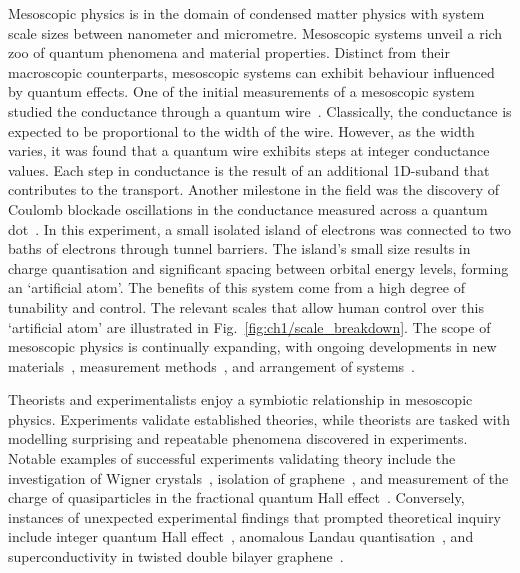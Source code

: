 \noindent Mesoscopic physics is in the domain of condensed matter physics with system scale sizes between nanometer and micrometre. Mesoscopic systems unveil a rich zoo of quantum phenomena and material properties. 
Distinct from their macroscopic counterparts, mesoscopic systems can exhibit behaviour influenced by quantum effects. One of the initial measurements of a mesoscopic system studied the conductance through a quantum wire~\cite{qpc_first_measurement, qpc_second_measurement}. 
Classically, the conductance is expected to be proportional to the width of the wire. 
However, as the width varies, it was found that a quantum wire exhibits steps at integer conductance values. Each step in conductance 
is the result of an additional 1D-suband that contributes to the transport. Another milestone in the field was the discovery of Coulomb blockade oscillations in the conductance measured across a quantum dot~\cite{first_charging_of_qd}. 
In this experiment, a small isolated island of electrons was connected to two baths of electrons through tunnel barriers. 
The island's small size results in charge quantisation and significant spacing between orbital energy levels, forming an `artificial atom'. 
The benefits of this system come from a high degree of tunability and control. The relevant scales that allow human control over this `artificial atom' are illustrated in Fig.~\ref{fig:ch1/scale_breakdown}.
The scope of mesoscopic physics is continually expanding, with ongoing developments in new materials~\cite{manfra_inas}, measurement methods~\cite{child_meas}, and arrangement of systems~\cite{borsoi2022shared, raysu}.

Theorists and experimentalists enjoy a symbiotic relationship in mesoscopic physics. Experiments validate established theories, while theorists are tasked with modelling surprising and repeatable phenomena discovered in experiments. Notable examples of successful experiments validating theory include the investigation of Wigner crystals~\cite{wigner_solid}, isolation of graphene~\cite{graphene}, and measurement of the charge of quasiparticles in the fractional quantum Hall effect~\cite{fractional_charge}. Conversely, instances of unexpected experimental findings that prompted theoretical inquiry include integer quantum Hall effect~\cite{klitzing}, anomalous Landau quantisation~\cite{landau_quantisation}, and superconductivity in twisted double bilayer graphene~\cite{raysu}.


